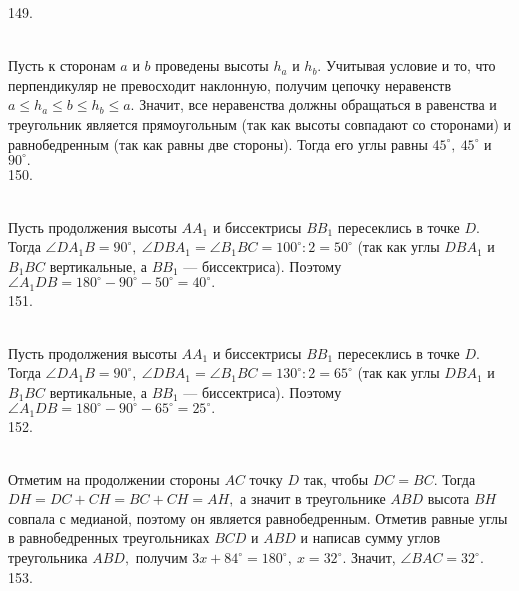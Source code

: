 149. \begin{figure}[ht!]
\end{figure}\\
Пусть к сторонам $a$ и $b$ проведены высоты $h_a$ и $h_b.$ Учитывая условие и то, что перпендикуляр не превосходит наклонную, получим цепочку неравенств $a\leqslant h_a\leqslant b \leqslant h_b \leqslant a.$ Значит, все неравенства должны обращаться в равенства и треугольник является прямоугольным (так как высоты совпадают со сторонами) и равнобедренным (так как равны две стороны). Тогда его углы равны $45^\circ,\ 45^\circ$ и $90^\circ.$\\
150. \begin{figure}[ht!]
\end{figure}\\
Пусть продолжения высоты $AA_1$ и биссектрисы $BB_1$ пересеклись в точке $D.$ Тогда $\angle DA_1B=90^\circ,\ \angle DBA_1=\angle B_1BC=100^\circ:2=50^\circ$ (так как углы $DBA_1$ и $B_1BC$ вертикальные, а $BB_1$ --- биссектриса). Поэтому $\angle A_1DB=180^\circ-90^\circ-50^\circ=40^\circ.$\\
151.  \begin{figure}[ht!]
\end{figure}\\
Пусть продолжения высоты $AA_1$ и биссектрисы $BB_1$ пересеклись в точке $D.$ Тогда $\angle DA_1B=90^\circ,\ \angle DBA_1=\angle B_1BC=130^\circ:2=65^\circ$ (так как углы $DBA_1$ и $B_1BC$ вертикальные, а $BB_1$ --- биссектриса). Поэтому $\angle A_1DB=180^\circ-90^\circ-65^\circ=25^\circ.$\\
152. \begin{figure}[ht!]
\end{figure}\\
Отметим на продолжении стороны $AC$ точку $D$ так, чтобы $DC=BC.$ Тогда $DH=DC+CH=BC+CH=AH,$ а значит в треугольнике $ABD$ высота $BH$ совпала с медианой, поэтому он является равнобедренным. Отметив равные углы в равнобедренных треугольниках $BCD$ и $ABD$ и написав сумму углов треугольника $ABD,$ получим $3x+84^\circ=180^\circ,\ x=32^\circ.$ Значит, $\angle BAC=32^\circ.$\\
153. \begin{figure}[ht!]
\end{figure}\\
